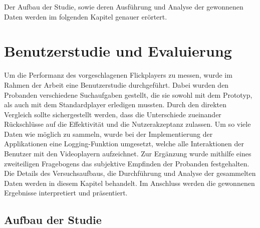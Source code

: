 \documentclass[11pt,a4paper]{report}
\begin{document}
Der Aufbau der Studie, sowie deren Ausführung und Analyse der gewonnenen Daten werden im folgenden Kapitel genauer erörtert.

\chapter{Benutzerstudie und Evaluierung}

Um die Performanz des vorgeschlagenen Flickplayers zu messen, wurde im Rahmen der Arbeit eine Benutzerstudie durchgeführt. Dabei wurden den Probanden verschiedene Suchaufgaben gestellt, die sie sowohl mit dem Prototyp, als auch mit dem Standardplayer erledigen mussten. Durch den direkten Vergleich sollte sichergestellt werden, dass die Unterschiede zueinander Rückschlüsse auf die Effektivität und die Nutzerakzeptanz zulassen. Um so viele Daten wie möglich zu sammeln, wurde bei der Implementierung der Applikationen eine Logging-Funktion umgesetzt, welche alle Interaktionen der Benutzer mit den Videoplayern aufzeichnet. Zur Ergänzung wurde mithilfe eines zweiteiligen Fragebogens das subjektive Empfinden der Probanden festgehalten. Die Details des Versuchsaufbaus, die Durchführung und Analyse der gesammelten Daten werden in diesem Kapitel behandelt. Im Anschluss werden die gewonnenen Ergebnisse interpretiert und präsentiert.

\section{Aufbau der Studie}
\end{document}
